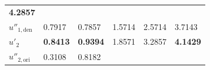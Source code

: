 \begin{longtable}[]{@{}llllll@{}}
\begin{minipage}[t]{0.17\columnwidth}
\textbf{4.2857}\strut
\end{minipage}\tabularnewline
\begin{minipage}[t]{0.15\columnwidth}\raggedright
\(u''_{1,\text{den}}\)\strut
\end{minipage} & \begin{minipage}[t]{0.08\columnwidth}\raggedright
0.7917\strut
\end{minipage} & \begin{minipage}[t]{0.07\columnwidth}\raggedright
0.7857\strut
\end{minipage} & \begin{minipage}[t]{0.20\columnwidth}\raggedright
1.5714\strut
\end{minipage} & \begin{minipage}[t]{0.17\columnwidth}\raggedright
2.5714\strut
\end{minipage} & \begin{minipage}[t]{0.17\columnwidth}\raggedright
3.7143\strut
\end{minipage}\tabularnewline
\begin{minipage}[t]{0.15\columnwidth}\raggedright
\(u'_2\)\strut
\end{minipage} & \begin{minipage}[t]{0.08\columnwidth}\raggedright
\textbf{0.8413}\strut
\end{minipage} & \begin{minipage}[t]{0.07\columnwidth}\raggedright
\textbf{0.9394}\strut
\end{minipage} & \begin{minipage}[t]{0.20\columnwidth}\raggedright
1.8571\strut
\end{minipage} & \begin{minipage}[t]{0.17\columnwidth}\raggedright
3.2857\strut
\end{minipage} & \begin{minipage}[t]{0.17\columnwidth}\raggedright
\textbf{4.1429}\strut
\end{minipage}\tabularnewline
\begin{minipage}[t]{0.15\columnwidth}\raggedright
\(u''_{2,\text{ori}}\)\strut
\end{minipage} & \begin{minipage}[t]{0.08\columnwidth}\raggedright
0.3108\strut
\end{minipage} & \begin{minipage}[t]{0.07\columnwidth}\raggedright
0.8182\strut
\end{minipage} & \begin{minipage}[t]{0.20\columnwidth}\raggedright

\end{minipage}
\end{longtable}
